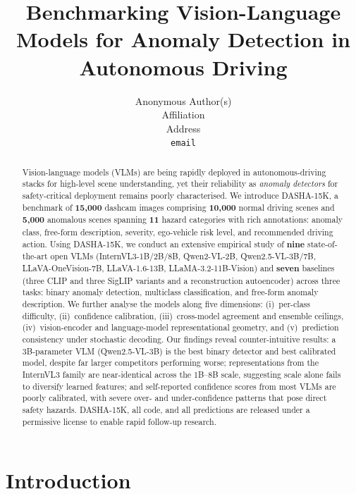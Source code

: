 \documentclass{article}
\title{Benchmarking Vision-Language Models for Anomaly Detection
       in Autonomous Driving}
\author{%
  Anonymous Author(s) \\
  Affiliation \\
  Address \\
  \texttt{email} \\
}
\newcommand{\bench}{\textsc{DASHA-15K}\xspace}
\begin{document}
\maketitle

\begin{abstract}
Vision-language models (VLMs) are being rapidly deployed in
autonomous-driving stacks for high-level scene understanding, yet
their reliability as \emph{anomaly detectors} for safety-critical
deployment remains poorly characterised. We introduce \bench, a
benchmark of \textbf{15{,}000} dashcam images comprising
\textbf{10{,}000} normal driving scenes and \textbf{5{,}000} anomalous
scenes spanning \textbf{11} hazard categories with rich annotations:
anomaly class, free-form description, severity, ego-vehicle risk
level, and recommended driving action. Using \bench, we conduct an
extensive empirical study of \textbf{nine} state-of-the-art open
VLMs (InternVL3-1B/2B/8B, Qwen2-VL-2B, Qwen2.5-VL-3B/7B,
LLaVA-OneVision-7B, LLaVA-1.6-13B, LLaMA-3.2-11B-Vision) and
\textbf{seven} baselines (three CLIP and three SigLIP variants and a
reconstruction autoencoder) across three tasks: binary anomaly
detection, multiclass classification, and free-form anomaly
description. We further analyse the models along five dimensions:
(i)~per-class difficulty, (ii)~confidence calibration,
(iii)~cross-model agreement and ensemble ceilings,
(iv)~vision-encoder and language-model representational geometry, and
(v)~prediction consistency under stochastic decoding. Our findings
reveal counter-intuitive results: a 3B-parameter VLM
(Qwen2.5-VL-3B) is the best binary detector and best calibrated
model, despite far larger competitors performing worse;
representations from the InternVL3 family are near-identical across
the 1B--8B scale, suggesting scale alone fails to diversify learned
features; and self-reported confidence scores from most VLMs are
poorly calibrated, with severe over- and under-confidence patterns
that pose direct safety hazards. \bench, all code, and all
predictions are released under a permissive license to enable rapid
follow-up research.
\end{abstract}

\section{Introduction}
\label{sec:intro}
\end{document}
